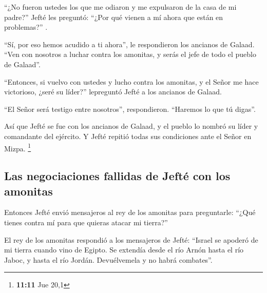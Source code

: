  ``¿No fueron ustedes los que me odiaron y me expulsaron
de la casa de mi padre?'' Jefté les preguntó: ``¿Por qué vienen a mí
ahora que están en problemas?'' .

 ``Sí, por eso hemos acudido a ti ahora'', le respondieron
los ancianos de Galaad. ``Ven con nosotros a luchar contra los amonitas,
y serás el jefe de todo el pueblo de Galaad''.

 ``Entonces, si vuelvo con ustedes y lucho contra los
amonitas, y el Señor me hace victorioso, ¿seré su líder?'' lepreguntó
Jefté a los ancianos de Galaad.

 ``El Señor será testigo entre nosotros'', respondieron.
``Haremos lo que tú digas''.

 Así que Jefté se fue con los ancianos de Galaad, y el
pueblo lo nombró su líder y comandante del ejército. Y Jefté repitió
todas sus condiciones ante el Señor en Mizpa. \footnote{\textbf{11:11}
  Jue 20,1}

\hypertarget{las-negociaciones-fallidas-de-jeftuxe9-con-los-amonitas}{%
\subsection{Las negociaciones fallidas de Jefté con los
amonitas}\label{las-negociaciones-fallidas-de-jeftuxe9-con-los-amonitas}}

 Entonces Jefté envió mensajeros al rey de los amonitas
para preguntarle: ``¿Qué tienes contra mí para que quieras atacar mi
tierra?''

 El rey de los amonitas respondió a los mensajeros de
Jefté: ``Israel se apoderó de mi tierra cuando vino de Egipto. Se
extendía desde el río Arnón hasta el río Jaboc, y hasta el río Jordán.
Devuélvemela y no habrá combates''.

